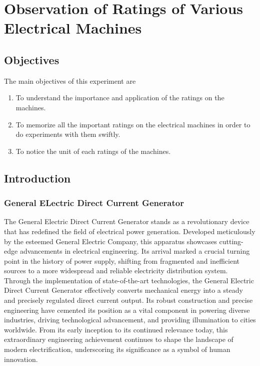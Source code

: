 

\chapter{Observation of Ratings of Various Electrical Machines}
\label{exp1}


\section{Objectives}
The main objectives of this experiment are
\begin{enumerate}
  \item To understand the importance and application of the ratings on the machines.
  \item To memorize all the important ratings on the electrical machines in order to do experiments with them swiftly.
  \item To  notice the unit of each ratings of the machines.
\end{enumerate}

\section{Introduction}
\subsection{General ELectric Direct Current Generator}
The General Electric Direct Current Generator stands as a revolutionary device that has redefined the field of electrical power generation. Developed meticulously by the esteemed General Electric Company, this apparatus showcases cutting-edge advancements in electrical engineering. Its arrival marked a crucial turning point in the history of power supply, shifting from fragmented and inefficient sources to a more widespread and reliable electricity distribution system.
Through the implementation of state-of-the-art technologies, the General Electric Direct Current Generator effectively converts mechanical energy into a steady and precisely regulated direct current output. Its robust construction and precise engineering have cemented its position as a vital component in powering diverse industries, driving technological advancement, and providing illumination to cities worldwide. From its early inception to its continued relevance today, this extraordinary engineering achievement continues to shape the landscape of modern electrification, underscoring its significance as a symbol of human innovation.
